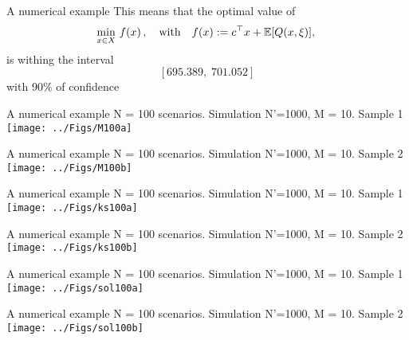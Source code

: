 \begin{frame}{A numerical example}
This means that the optimal value of
\[
 \min_{x \in  X}\,f(x)\,,\quad\mbox{with}\quad f(x):=c^\top  x + \mathbb{E}[Q(x, \xi)],\;
\]
is withing the interval
\[
[695.389, \; 701.052]
\]
with 90\% of confidence
\end{frame}

\begin{frame}{A numerical example}
{N = 100 scenarios. Simulation N'=1000, M = 10. Sample 1}
\centering \texttt{[image: ../Figs/M100a]}
\end{frame}

\begin{frame}{A numerical example}
{N = 100 scenarios. Simulation N'=1000, M = 10. Sample 2}
\centering \texttt{[image: ../Figs/M100b]}
\end{frame}



\begin{frame}{A numerical example}
{N = 100 scenarios. Simulation N'=1000, M = 10. Sample 1}
\centering \texttt{[image: ../Figs/ks100a]}
\end{frame}

\begin{frame}{A numerical example}
{N = 100 scenarios. Simulation N'=1000, M = 10. Sample 2}
\centering \texttt{[image: ../Figs/ks100b]}
\end{frame}

\begin{frame}{A numerical example}
{N = 100 scenarios. Simulation N'=1000, M = 10. Sample 1}
\centering \texttt{[image: ../Figs/sol100a]}
\end{frame}

\begin{frame}{A numerical example}
{N = 100 scenarios. Simulation N'=1000, M = 10. Sample 2}
\centering \texttt{[image: ../Figs/sol100b]}
\end{frame}

